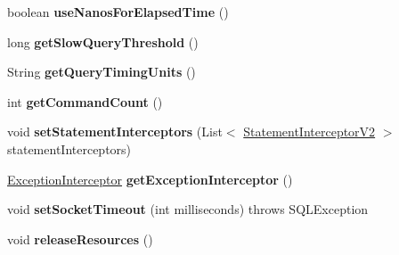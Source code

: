 \begin{DoxyCompactItemize}
boolean {\bfseries use\+Nanos\+For\+Elapsed\+Time} ()
\item 
\mbox{\label{classcom_1_1mysql_1_1jdbc_1_1_mysql_i_o_a167a2084286b2e759186ecadfd2c9af3}} 
long {\bfseries get\+Slow\+Query\+Threshold} ()
\item 
\mbox{\label{classcom_1_1mysql_1_1jdbc_1_1_mysql_i_o_a4f34934b7a7501c35f1e5f4783e60b9e}} 
String {\bfseries get\+Query\+Timing\+Units} ()
\item 
\mbox{\label{classcom_1_1mysql_1_1jdbc_1_1_mysql_i_o_aa54b5e173904097597a8d31716719d8d}} 
int {\bfseries get\+Command\+Count} ()
\item 
\mbox{\label{classcom_1_1mysql_1_1jdbc_1_1_mysql_i_o_a2d94ecc8769d2df1743be282bf32ed59}} 
void {\bfseries set\+Statement\+Interceptors} (List$<$ \mbox{\hyperlink{interfacecom_1_1mysql_1_1jdbc_1_1_statement_interceptor_v2}{Statement\+Interceptor\+V2}} $>$ statement\+Interceptors)
\item 
\mbox{\label{classcom_1_1mysql_1_1jdbc_1_1_mysql_i_o_a3b8d395692790c90ea56bddb5aeeaf92}} 
\mbox{\hyperlink{interfacecom_1_1mysql_1_1jdbc_1_1_exception_interceptor}{Exception\+Interceptor}} {\bfseries get\+Exception\+Interceptor} ()
\item 
\mbox{\label{classcom_1_1mysql_1_1jdbc_1_1_mysql_i_o_a1b10092e5a778b972264df381478e71c}} 
void {\bfseries set\+Socket\+Timeout} (int milliseconds)  throws S\+Q\+L\+Exception 
\item 
\mbox{\label{classcom_1_1mysql_1_1jdbc_1_1_mysql_i_o_a93f8cb846651a3256047f9fbe703cff9}} 
void {\bfseries release\+Resources} ()
\end{DoxyCompactItemize}
